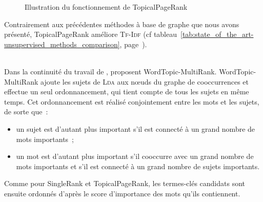 \begin{figure}[t]
          \caption{Illustration du fonctionnement de TopicalPageRank~\cite{liu2010topicalpagerank}
                   \label{fig:topicalpagerank}}
        \end{figure}

        Contrairement aux précédentes méthodes à base de graphe que nous avons
        présenté, TopicalPageRank améliore \textsc{Tf-Idf} (cf
        tableau~\ref{tab:state_of_the_art-unsupervised_methods_comparison},
        page~\pageref{tab:state_of_the_art-unsupervised_methods_comparison}).

        ~\\Dans la continuité du travail de ,
         proposent WordTopic-MultiRank.
        WordTopic-MultiRank ajoute les sujets de \textsc{Lda} aux n\oe{}uds du
        graphe de cooccurrences et effectue un seul ordonnancement, qui tient
        compte de tous les sujets en même temps. Cet ordonnancement est réalisé
        conjointement entre les mots et les sujets, de sorte que~:
        \begin{itemize}
          \item{un sujet est d'autant plus important s'il est connecté à un
                grand nombre de mots importants~;}
          \item{un mot est d'autant plus important s'il cooccurre avec un grand
                nombre de mots importants et s'il est connecté à un grand nombre
                de sujets importants.}
        \end{itemize}
        Comme pour SingleRank et TopicalPageRank, les termes-clés candidats sont
        ensuite ordonnés d'après le score d'importance des mots qu'ils
        contiennent.

